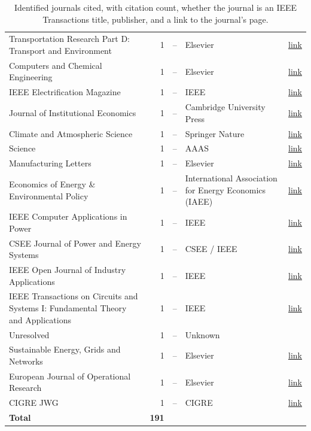 \begin{table}[htbp]
\begin{tabular}{lrcll}
    Transportation Research Part D: Transport and Environment & 1 & -- & Elsevier & \href{https://www.sciencedirect.com/journal/transportation-research-part-d-transport-and-environment}{link} \\
    Computers and Chemical Engineering & 1 & -- & Elsevier & \href{https://www.sciencedirect.com/journal/computers-and-chemical-engineering}{link} \\
    IEEE Electrification Magazine & 1 & -- & IEEE & \href{https://ieee-pes.org/publication-item/electrification-magazine/}{link} \\
    Journal of Institutional Economics & 1 & -- & Cambridge University Press & \href{https://www.cambridge.org/core/journals/journal-of-institutional-economics}{link} \\
    Climate and Atmospheric Science & 1 & -- & Springer Nature & \href{https://www.nature.com/npjclimatsci/}{link} \\
    Science & 1 & -- & AAAS & \href{https://www.science.org}{link} \\
    Manufacturing Letters & 1 & -- & Elsevier & \href{https://www.sciencedirect.com/journal/manufacturing-letters}{link} \\
    Economics of Energy \& Environmental Policy & 1 & -- & International Association for Energy Economics (IAEE) & \href{https://www.iaee.org/en/publications/eeepjournal.aspx}{link} \\
    IEEE Computer Applications in Power & 1 & -- & IEEE & \href{https://ieeexplore.ieee.org/xpl/RecentIssue.jsp?punumber=67}{link} \\
    CSEE Journal of Power and Energy Systems & 1 & -- & CSEE / IEEE & \href{https://ieeexplore.ieee.org/xpl/RecentIssue.jsp?punumber=7054730}{link} \\
    IEEE Open Journal of Industry Applications & 1 & -- & IEEE & \href{https://ieeexplore.ieee.org/xpl/RecentIssue.jsp?punumber=8782707}{link} \\
    IEEE Transactions on Circuits and Systems I: Fundamental Theory and Applications & 1 & -- & IEEE & \href{https://ieeexplore.ieee.org/xpl/RecentIssue.jsp?punumber=81}{link} \\
    Unresolved & 1 & -- & Unknown &  \\
    Sustainable Energy, Grids and Networks & 1 & -- & Elsevier & \href{https://www.sciencedirect.com/journal/sustainable-energy-grids-and-networks}{link} \\
    European Journal of Operational Research & 1 & -- & Elsevier & \href{https://www.sciencedirect.com/journal/european-journal-of-operational-research}{link} \\
    CIGRE JWG & 1 & -- & CIGRE & \href{https://www.cigre.org/GB/publications/electra}{link} \\
\midrule
    \textbf{Total} & \textbf{191} & & & \\
\bottomrule
\end{tabular}
\caption{Identified journals cited, with citation count, whether the journal is an IEEE Transactions title, publisher, and a link to the journal's page.}
\label{tab:journal_publishers}
\end{table}

